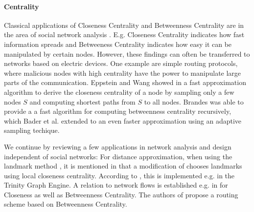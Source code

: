 \documentclass[11pt]{article}
\newcommand{\todoI}[1]{}\newcommand{\blueI}[1]{}
\begin{document}
\paragraph{Centrality}
Classical applications of Closeness Centrality \cite{bavelas1950communication,beauchamp1965} and Betweenness Centrality \cite{freeman1977} are in the area of social network analysis \cite{wasserman1994social}. E.g. Closeness Centrality indicates how fast information spreads and Betweeness Centrality indicates how easy it can be manipulated by certain nodes. However, these findings can often be transferred to networks based on electric devices. One example are simple routing protocols, where malicious nodes with high centrality have the power to manipulate large parts of the communication. Eppstein and Wang showed in \cite{eppstein:2001:fastCCapprox} a fast approximation algorithm to derive the closeness centrality of a node by sampling only a few nodes $S$ and computing shortest paths from $S$ to all nodes. Brandes \cite{brandes:2001:fasterBCalgo} was able to provide a a fast algorithm for computing betweenness centrality recursively, which Bader et al. \cite{bader:2007:BCapprox} extended to an even faster approximation using an adaptive sampling techique.

We continue by reviewing a few applications in network analysis and design independent of social networks: For distance approximation, when using the landmark method \cite{ng2002predicting,pias2003lighthouses}, it is mentioned in \cite{aggarwal2010survey} that a modification of \cite{rattigan2007graph} chooses landmarks using local closeness centrality. According to \cite{shao2013trinity}, this is  implemented e.g. in the Trinity Graph Engine.
A relation to network flows is established e.g. in \cite{borgatti2005centrality} for Closeness as well as Betweenness Centrality. The authors of \cite{daly2007social} propose a routing scheme based on Betweenness Centrality. \todoI{wiki has more stuff on routing}
\end{document}
